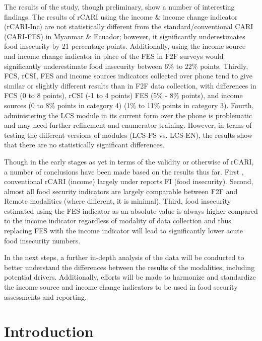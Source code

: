\documentclass[11pt,harvard]{article}
\begin{document}
The results of the study, though preliminary, show a number of interesting findings. The results of rCARI using the income \& income change indicator (rCARI-Inc) are not statistically different from the standard/conventional CARI (CARI-FES) in Myanmar \& Ecuador; however, it significantly underestimates food insecurity by 21 percentage points. Additionally, using the income source and income change indicator in place of the FES in F2F surveys would significantly underestimate food insecurity between 6\% to 22\% points. Thirdly, FCS, rCSI, FES and income sources indicators collected over phone tend to give similar or slightly different results than in F2F data collection, with differences in FCS (0 to 8 points), rCSI (-1 to 4 points) FES (5\% - 8\% points), and income sources (0 to 8\% points in category 4) (1\% to 11\% points in category 3). Fourth, administering the LCS module in its current form over the phone is problematic and may need further refinement and enumerator training. However, in terms of testing the different versions of modules (LCS-FS vs. LCS-EN), the results show that there are no statistically significant differences.
 
Though in the early stages as yet in terms of the validity or otherwise of rCARI, a number of conclusions have been made based on the results thus far. First , conventional rCARI (income) largely under reports FI (food insecurity).  Second, almost all food security indicators are largely comparable between F2F and Remote modalities (where different, it is minimal). Third, food insecurity estimated using the FES indicator as an absolute value is always higher compared to the income indicator regardless of modality of data collection and thus replacing FES with the income indicator will lead to significantly lower acute food insecurity numbers. 

In the next steps, a further in-depth analysis of the data will be conducted to better understand the differences between the results of the modalities, including potential drivers. Additionally, efforts will be made to harmonize and standardize the income source and income change indicators to be used in food security assessments and reporting.


\pagebreak
	
\section{Introduction}
\end{document}
